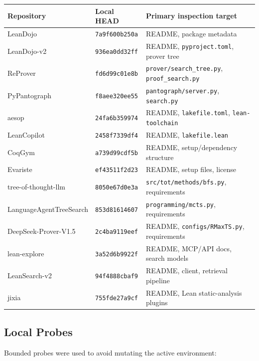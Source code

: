 \documentclass[11pt]{article}
\begin{document}
\begin{center}
\small
\begin{tabular}{lll}
\toprule
Repository & Local HEAD & Primary inspection target \\
\midrule
LeanDojo & \texttt{7a9f600b250a} & README, package metadata \\
LeanDojo-v2 & \texttt{936ea0dd32ff} & README, \texttt{pyproject.toml}, prover tree \\
ReProver & \texttt{fd6d99c01e8b} & \texttt{prover/search\_tree.py}, \texttt{proof\_search.py} \\
PyPantograph & \texttt{f8aee320ee55} & \texttt{pantograph/server.py}, \texttt{search.py} \\
aesop & \texttt{24fa6b359974} & README, \texttt{lakefile.toml}, \texttt{lean-toolchain} \\
LeanCopilot & \texttt{2458f7339df4} & README, \texttt{lakefile.lean} \\
CoqGym & \texttt{a739d99cdf5b} & README, setup/dependency structure \\
Evariste & \texttt{ef43511f2d23} & README, setup files, license \\
tree-of-thought-llm & \texttt{8050e67d0e3a} & \texttt{src/tot/methods/bfs.py}, requirements \\
LanguageAgentTreeSearch & \texttt{853d81614607} & \texttt{programming/mcts.py}, requirements \\
DeepSeek-Prover-V1.5 & \texttt{2c4ba9119eef} & README, \texttt{configs/RMaxTS.py}, requirements \\
lean-explore & \texttt{3a52d6b9922f} & README, MCP/API docs, search models \\
LeanSearch-v2 & \texttt{94f4888cbaf9} & README, client, retrieval pipeline \\
jixia & \texttt{755fde27a9cf} & README, Lean static-analysis plugins \\
\bottomrule
\end{tabular}
\end{center}

\subsection{Local Probes}

Bounded probes were used to avoid mutating the active environment:
\end{document}
